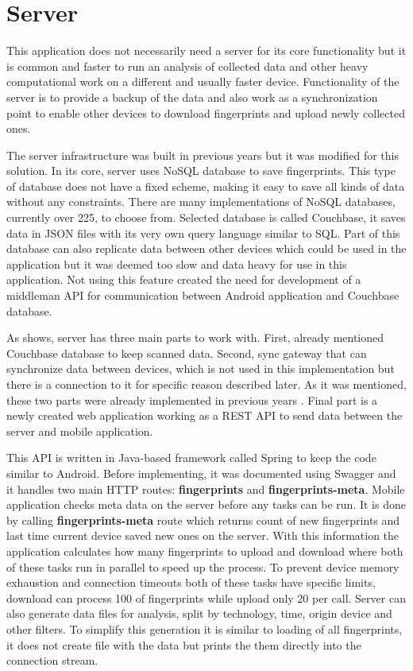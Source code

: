 \section{Server}\label{sec:Server}
This application does not necessarily need a server for its core functionality but it is common and faster to run an analysis of collected data and other heavy computational work on a different and usually faster device. Functionality of the server is to provide a backup of the data and also work as a synchronization point to enable other devices to download fingerprints and upload newly collected ones.

The server infrastructure was built in previous years \cite{IILUBLEB} but it was modified for this solution. In its core, server uses NoSQL database to save fingerprints. This type of database does not have a fixed scheme, making it easy to save all kinds of data without any constraints. There are many implementations of NoSQL databases, currently over 225, to choose from. Selected database is called Couchbase, it saves data in JSON files with its very own query language similar to SQL. Part of this database can also replicate data between other devices which could be used in the application but it was deemed too slow and data heavy for use in this application. Not using this feature created the need for development of a middleman API for communication between Android application and Couchbase database.

As  shows, server has three main parts to work with. First, already mentioned Couchbase database to keep scanned data. Second, sync gateway that can synchronize data between devices, which is not used in this implementation but there is a connection to it for specific reason described later. As it was mentioned, these two parts were already implemented in previous years \cite{IILUBLEB}. Final part is a newly created web application working as a REST API to send data between the server and mobile application. 

This API is written in Java-based framework called Spring to keep the code similar to Android. Before implementing, it was documented using Swagger and it handles two main HTTP routes: \textbf{fingerprints} and \textbf{fingerprints-meta}. Mobile application checks meta data on the server before any tasks can be run. It is done by calling \textbf{fingerprints-meta} route which returns count of new fingerprints and last time current device saved new ones on the server. With this information the application calculates how many fingerprints to upload and download where both of these tasks run in parallel to speed up the process. To prevent device memory exhaustion and connection timeouts both of these tasks have specific limits, download can process 100 of fingerprints while upload only 20 per call. Server can also generate data files for analysis, split by technology, time, origin device and other filters. To simplify this generation it is similar to loading of all fingerprints, it does not create file with the data but prints the them directly into the connection stream.

